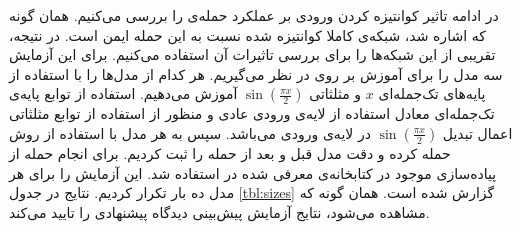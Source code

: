 \documentclass[12pt,onecolumn,a4paper]{article}
\begin{document}
در ادامه تاثیر کوانتیزه کردن ورودی بر عملکرد حمله‌ی  را بررسی می‌کنیم. همان گونه که اشاره شد، شبکه‌ی کاملا کوانتیزه شده نسبت به این حمله ایمن است. در نتیجه، تقریبی از این شبکه‌ها را برای بررسی تاثیرات آن استفاده می‌کنیم. برای این آزمایش سه مدل را برای آموزش بر روی
در نظر می‌گیریم. هر کدام از مدل‌ها را با استفاده از پایه‌های تک‌جمله‌ای $x$ و مثلثاتی $\sin(\frac{\pi x}{2})$ آموزش می‌دهیم. استفاده از توابع پایه‌ی تک‌جمله‌ای معادل استفاده از لایه‌ی ورودی عادی و منظور از استفاده از توابع مثلثاتی اعمال تبدیل $\sin(\frac{\pi x}{2})$ در لایه‌ی ورودی می‌باشد. سپس به هر مدل با استفاده از روش
حمله کرده و  دقت مدل قبل و بعد از حمله را ثبت کردیم. برای انجام حمله از پیاده‌سازی موجود در کتابخانه‌ی معرفی شده در 
\cite{papernot2018cleverhans}
استفاده شد. این آزمایش را برای هر مدل ده بار تکرار کردیم. نتایج در جدول
\ref{tbl:sizes}
گزارش شده است. همان گونه که مشاهده می‌شود، نتایج آزمایش پیش‌بینی دیدگاه پیشنهادی را تایید می‌کند.

\begin{table}[]
    \begin{latin}
    \end{latin}
    \caption{مدل‌های استفاده شده در آزمایش، ابعاد آنها و دقت آنها قبل و پس از حمله‌ی . همان طور که مشاهده می‌شود، کوانتیزه کردن ورودی تاثیر بسیار قابل توجهی بر روی شانس موفقیت حمله دارد.}
    \label{tbl:sizes}
\end{table}
\end{document}
